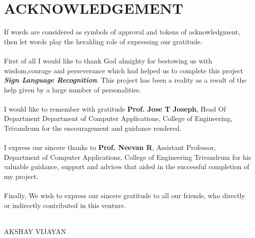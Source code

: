 \chapter*{\rm \large \bf ACKNOWLEDGEMENT}
\vspace{4.0mm}
\setlength{\parindent}{1cm} 


\indent If words are considered as symbols of approval and tokens of
acknowledgment, then let words play the heralding role of expressing our
gratitude.\\ \\

\indent First of all I would like to thank God almighty for bestowing us with
wisdom,courage and perseverance which had helped us to complete this
project \textbf{\textit{Sign Language Recognition}}.
This project has been a reality as a result of the help given by a large
number of personalities.\\ \\

\indent I would like to remember with gratitude \textbf{Prof. Jose T Joseph},
Head Of Department Department of Computer Applications, College of Engineering,
Trivandrum for the encouragement and guidance rendered.\\ \\

\indent I express our sincere thanks to \textbf{Prof. Neevan R}, Assistant
Professor, Department of Computer Applications, College of Engineering
Trivandrum for his valuable guidance, support and advices that aided in the
successful completion of my project.\\ \\

\indent Finally, We wish to express our sincere gratitude to all our friends,
who directly or indirectly contributed in this venture. \\ \\




\begin{flushright}
AKSHAY VIJAYAN\\
\end{flushright}
\newpage

